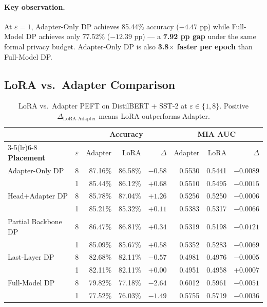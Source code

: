 \documentclass[11pt,letterpaper]{article}
\newcommand{\eps}{\varepsilon}
\begin{document}
\paragraph{Key observation.}
At $\eps=1$, Adapter-Only DP achieves 85.44\% accuracy ($-4.47$ pp) while
Full-Model DP achieves only 77.52\% ($-12.39$ pp) --- a \textbf{7.92 pp gap}
under the same formal privacy budget.
Adapter-Only DP is also \textbf{3.8$\times$ faster per epoch} than Full-Model DP.

\subsection{LoRA vs.\ Adapter Comparison}

\begin{table}[h]
\centering
\caption{LoRA vs.\ Adapter PEFT on DistilBERT + SST-2 at $\eps \in \{1,8\}$.
  Positive $\Delta_{\text{LoRA-Adapter}}$ means LoRA outperforms Adapter.}
\label{tab:lora_vs_adapter}
\small
\setlength{\tabcolsep}{4pt}
\begin{tabular}{lc rr r rr r}
\toprule
 & & \multicolumn{3}{c}{\textbf{Accuracy}} & \multicolumn{3}{c}{\textbf{MIA AUC}} \\
\cmidrule(lr){3-5}\cmidrule(lr){6-8}
\textbf{Placement} & $\eps$
  & Adapter & LoRA & $\Delta$
  & Adapter & LoRA & $\Delta$ \\
\midrule
Adapter-Only DP & 8 & 87.16\% & 86.58\% & $-0.58$ & 0.5530 & 0.5441 & $-0.0089$ \\
                & 1 & 85.44\% & 86.12\% & $+0.68$ & 0.5510 & 0.5495 & $-0.0015$ \\
\midrule
Head+Adapter DP & 8 & 85.78\% & 87.04\% & $+1.26$ & 0.5256 & 0.5250 & $-0.0006$ \\
                & 1 & 85.21\% & 85.32\% & $+0.11$ & 0.5383 & 0.5317 & $-0.0066$ \\
\midrule
Partial Backbone DP & 8 & 86.47\% & 86.81\% & $+0.34$ & 0.5319 & 0.5198 & $-0.0121$ \\
                    & 1 & 85.09\% & 85.67\% & $+0.58$ & 0.5352 & 0.5283 & $-0.0069$ \\
\midrule
Last-Layer DP   & 8 & 82.68\% & 82.11\% & $-0.57$ & 0.4981 & 0.4976 & $-0.0005$ \\
                & 1 & 82.11\% & 82.11\% & $+0.00$ & 0.4951 & 0.4958 & $+0.0007$ \\
\midrule
Full-Model DP   & 8 & 79.82\% & 77.18\% & $-2.64$ & 0.6012 & 0.5961 & $-0.0051$ \\
                & 1 & 77.52\% & 76.03\% & $-1.49$ & 0.5755 & 0.5719 & $-0.0036$ \\
\bottomrule
\end{tabular}
\end{table}
\end{document}
